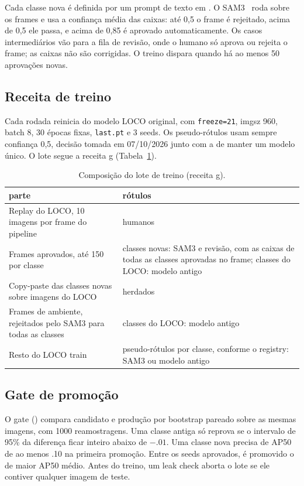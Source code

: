 \documentclass[11pt,a4paper]{article}
\begin{document}
Cada classe nova é definida por um prompt de texto em
. O SAM3~\cite{sam3} roda sobre os frames e usa a
confiança média das caixas: até 0,5 o frame é rejeitado, acima de 0,5 ele
passa, e acima de 0,85 é aprovado automaticamente. Os casos intermediários vão
para a fila de revisão, onde o humano só aprova ou rejeita o frame; as caixas
não são corrigidas. O treino dispara quando há ao menos 50 aprovações novas.

\subsection{Receita de treino}

Cada rodada reinicia do modelo LOCO original, com \texttt{freeze=21}, imgsz 960,
batch 8, 30 épocas fixas, \texttt{last.pt} e 3 seeds. Os pseudo-rótulos usam
sempre confiança 0,5, decisão tomada em 07/10/2026 junto com a de manter um
modelo único. O lote segue a receita g (Tabela~\ref{tab:receita}).

\begin{table}[H]
\centering\small
\caption{Composição do lote de treino (receita g).}
\label{tab:receita}
\begin{tabular}{p{7.2cm}p{7.6cm}}
\toprule
parte & rótulos \\
\midrule
Replay do LOCO, 10 imagens por frame do pipeline & humanos \\
Frames aprovados, até 150 por classe & classes novas: SAM3 e revisão, com as caixas de todas as classes aprovadas no frame; classes do LOCO: modelo antigo \\
Copy-paste das classes novas sobre imagens do LOCO & herdados \\
Frames de ambiente, rejeitados pelo SAM3 para todas as classes & classes do LOCO: modelo antigo \\
Resto do LOCO train & pseudo-rótulos por classe, conforme o registry: SAM3 ou modelo antigo \\
\bottomrule
\end{tabular}
\end{table}

\subsection{Gate de promoção}

O gate () compara candidato e produção por bootstrap
pareado sobre as mesmas imagens, com 1000 reamostragens. Uma classe antiga só
reprova se o intervalo de 95\% da diferença ficar inteiro abaixo de $-.01$. Uma
classe nova precisa de AP50 de ao menos .10 na primeira promoção. Entre os seeds
aprovados, é promovido o de maior AP50 médio. Antes do treino, um leak check
aborta o lote se ele contiver qualquer imagem de teste.
\end{document}
